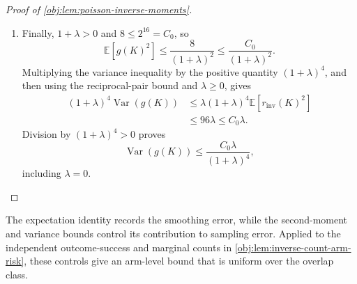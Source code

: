 \documentclass[11pt]{article}
\begin{document}
\begin{proof}[Proof of \cref{obj:lem:poisson-inverse-moments}]
\begin{enumerate}
\item Finally, \(1+\lambda>0\) and \(8\le2^{16}=C_0\), so
\[
\mathbb E[g(K)^2]
\le\frac8{(1+\lambda)^2}
\le\frac{C_0}{(1+\lambda)^2}.
\]
Multiplying the variance inequality by the positive quantity \((1+\lambda)^4\), and then using the reciprocal-pair bound and \(\lambda\ge0\), gives
\[
\begin{aligned}
(1+\lambda)^4\operatorname{Var}(g(K))
&\le\lambda(1+\lambda)^4\mathbb E[r_{\mathrm{inv}}(K)^2]\\
&\le96\lambda
\le C_0\lambda.
\end{aligned}
\]
Division by \((1+\lambda)^4>0\) proves
\[
\operatorname{Var}(g(K))
\le\frac{C_0\lambda}{(1+\lambda)^4},
\]
including \(\lambda=0\). %
\end{enumerate}
\end{proof}

The expectation identity records the smoothing error, while the second-moment and variance bounds control its contribution to sampling error. Applied to the independent outcome-success and marginal counts in \cref{obj:lem:inverse-count-arm-risk}, these controls give an arm-level bound that is uniform over the overlap class.
\end{document}
